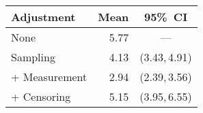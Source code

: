 \begin{tabular}{lrc}
  \toprule
  Adjustment    & Mean & 95\%~CI \\
  \midrule
  None          & 5.77 & --- \\
  Sampling      & 4.13 & (3.43,\,4.91) \\
  + Measurement & 2.94 & (2.39,\,3.56) \\
  + Censoring   & 5.15 & (3.95,\,6.55) \\
  \bottomrule
\end{tabular}
